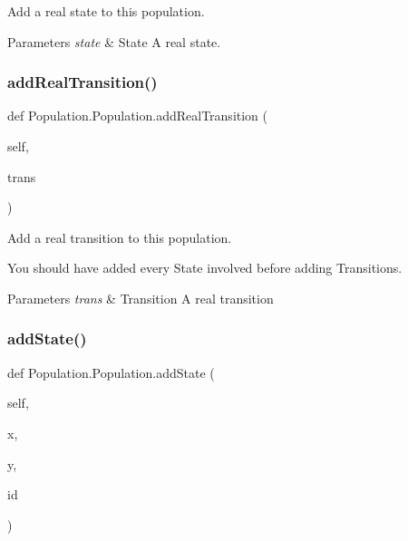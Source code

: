 Add a real state to this population. 


\begin{DoxyParams}{Parameters}
{\em state} & State A real state. \\
\hline
\end{DoxyParams}
\mbox{\label{classPopulation_1_1Population_aa68445393621fc0ec8713f533c959d02}} 
\subsubsection{\texorpdfstring{addRealTransition()}{addRealTransition()}}
{\footnotesize\ttfamily def Population.\+Population.\+add\+Real\+Transition (\begin{DoxyParamCaption}\item[{}]{self,  }\item[{}]{trans }\end{DoxyParamCaption})}



Add a real transition to this population. 

You should have added every State involved before adding Transitions. 
\begin{DoxyParams}{Parameters}
{\em trans} & Transition A real transition \\
\hline
\end{DoxyParams}
\mbox{\label{classPopulation_1_1Population_abac8ca83fe88481ceac9b60f20e21df3}} 
\subsubsection{\texorpdfstring{addState()}{addState()}}
{\footnotesize\ttfamily def Population.\+Population.\+add\+State (\begin{DoxyParamCaption}\item[{}]{self,  }\item[{}]{x,  }\item[{}]{y,  }\item[{}]{id }\end{DoxyParamCaption})}




